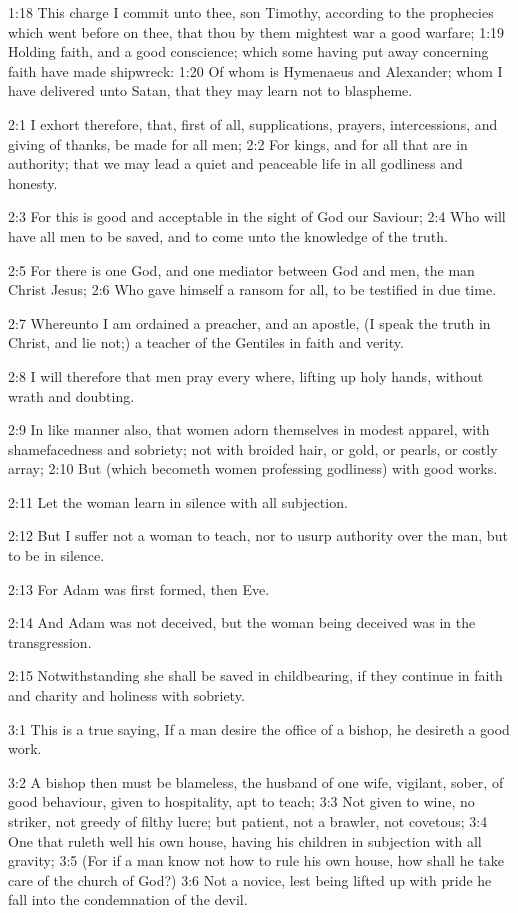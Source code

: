 1:18 This charge I commit unto thee, son Timothy, according to the prophecies which went before on thee, that thou by them mightest war a good warfare; 1:19 Holding faith, and a good conscience; which some having put away concerning faith have made shipwreck: 1:20 Of whom is Hymenaeus and Alexander; whom I have delivered unto Satan, that they may learn not to blaspheme.

2:1 I exhort therefore, that, first of all, supplications, prayers, intercessions, and giving of thanks, be made for all men; 2:2 For kings, and for all that are in authority; that we may lead a quiet and peaceable life in all godliness and honesty.

2:3 For this is good and acceptable in the sight of God our Saviour; 2:4 Who will have all men to be saved, and to come unto the knowledge of the truth.

2:5 For there is one God, and one mediator between God and men, the man Christ Jesus; 2:6 Who gave himself a ransom for all, to be testified in due time.

2:7 Whereunto I am ordained a preacher, and an apostle, (I speak the truth in Christ, and lie not;) a teacher of the Gentiles in faith and verity.

2:8 I will therefore that men pray every where, lifting up holy hands, without wrath and doubting.

2:9 In like manner also, that women adorn themselves in modest apparel, with shamefacedness and sobriety; not with broided hair, or gold, or pearls, or costly array; 2:10 But (which becometh women professing godliness) with good works.

2:11 Let the woman learn in silence with all subjection.

2:12 But I suffer not a woman to teach, nor to usurp authority over the man, but to be in silence.

2:13 For Adam was first formed, then Eve.

2:14 And Adam was not deceived, but the woman being deceived was in the transgression.

2:15 Notwithstanding she shall be saved in childbearing, if they continue in faith and charity and holiness with sobriety.

3:1 This is a true saying, If a man desire the office of a bishop, he desireth a good work.

3:2 A bishop then must be blameless, the husband of one wife, vigilant, sober, of good behaviour, given to hospitality, apt to teach; 3:3 Not given to wine, no striker, not greedy of filthy lucre; but patient, not a brawler, not covetous; 3:4 One that ruleth well his own house, having his children in subjection with all gravity; 3:5 (For if a man know not how to rule his own house, how shall he take care of the church of God?)  3:6 Not a novice, lest being lifted up with pride he fall into the condemnation of the devil.

